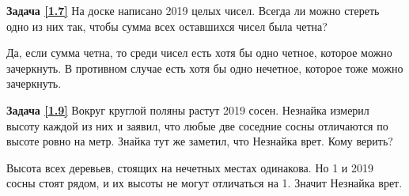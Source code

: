 %
\textbf{Задача \ref{1.7}}
	На доске написано 2019 целых чисел. Всегда ли можно стереть одно из них так, чтобы сумма всех оставшихся чисел была четна?

\begin{prf}
	Да, если сумма четна, то среди чисел есть хотя бы одно четное, которое можно зачеркнуть. В противном случае есть хотя бы одно нечетное, которое тоже можно зачеркнуть.
\end{prf}


\textbf{Задача \ref{1.9}}
	Вокруг круглой поляны растут 2019 сосен. Незнайка измерил высоту каждой из них и заявил, что любые две соседние сосны отличаются по высоте ровно на метр. Знайка тут же заметил, что Незнайка врет. Кому верить?
\begin{prf}
	Высота всех деревьев, стоящих на нечетных местах одинакова. Но 1 и 2019 сосны стоят рядом, и их высоты не могут отличаться на 1. Значит Незнайка врет.
\end{prf}
